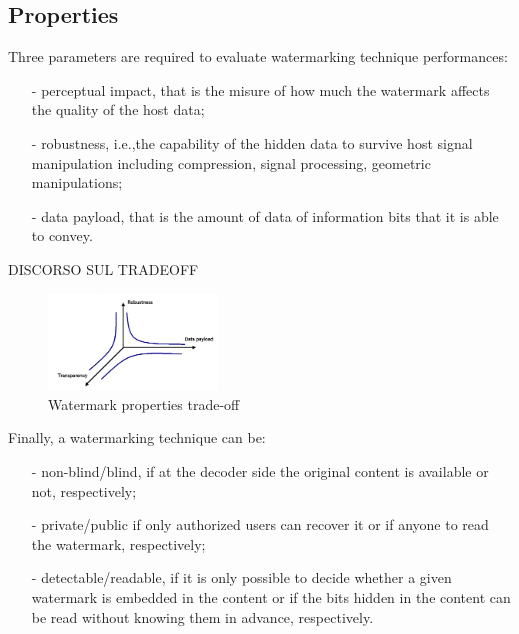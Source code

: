 \subsection{Properties}
Three parameters are required to evaluate watermarking technique performances:
\begin{itemize}
\item[-] perceptual impact, that is the misure of how much the watermark affects the quality of the host data;
\item[-] robustness, i.e.,the capability of the hidden data to survive host signal manipulation including compression, signal processing, geometric manipulations;
\item[-] data payload, that is the amount of data of information bits that it is able to convey.
\end{itemize}
DISCORSO SUL TRADEOFF
\begin{figure}[h!]
\centering
\includegraphics[width=0.4\textwidth]{./img/properties.png}
\caption{\small{Watermark properties trade-off}}
\label{fig:properties}
\end{figure}
Finally, a watermarking technique can be:
\begin{itemize}
\item[-] non-blind/blind, if at the decoder side the original content is available or not, respectively;
\item[-] private/public if only authorized users
can recover it or if anyone to read the watermark, respectively;
\item[-] detectable/readable, if it is only possible to decide whether a given watermark is embedded in the content or if the bits hidden in the content can be read without knowing them in advance, respectively.
\end{itemize}




